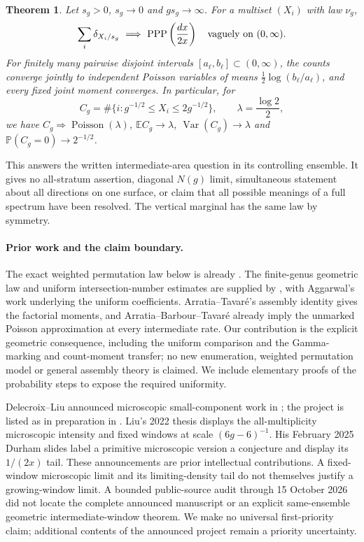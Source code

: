 \documentclass[11pt]{article}
\newtheorem{theorem}{Theorem}
\theoremstyle{remark}\newtheorem{remark}[theorem]{Remark}
\newcommand{\E}{\mathbb E}\newcommand{\Prob}{\mathbb P}
\newcommand{\Poi}{\operatorname{Poisson}}\newcommand{\Gam}{\operatorname{Gamma}}
\begin{document}
\begin{theorem}\label{thm:main}
Let $s_g>0$, $s_g\to0$ and $gs_g\to\infty$. For a multiset $(X_i)$ with law $\nu_g$,
\[
 \sum_i\delta_{X_i/s_g}\ \Longrightarrow\ \PPP\left(\frac{dx}{2x}\right)
 \quad\text{vaguely on }(0,\infty).
\]
For finitely many pairwise disjoint intervals $[a_\ell,b_\ell]\subset(0,\infty)$, the counts converge jointly to independent Poisson variables of means $\tfrac12\log(b_\ell/a_\ell)$, and every fixed joint moment converges. In particular, for
\[
 C_g=\#\{i:g^{-1/2}\le X_i\le2g^{-1/2}\},\qquad \lambda=\frac{\log2}{2},
\]
we have $C_g\Rightarrow\Poi(\lambda)$, $\E C_g\to\lambda$, $\operatorname{Var}(C_g)\to\lambda$ and $\Prob(C_g=0)\to2^{-1/2}$.
\end{theorem}

This answers the written intermediate-area question in its controlling ensemble. It gives no all-stratum assertion, diagonal $N(g)$ limit, simultaneous statement about all directions on one surface, or claim that all possible meanings of a full spectrum have been resolved. The vertical marginal has the same law by symmetry.

\paragraph{Prior work and the claim boundary.}
The exact weighted permutation law below is already \cite[(1.7)--(1.8), Lemma 3.6]{DGZZ}. The finite-genus geometric law and uniform intersection-number estimates are supplied by \cite{DL,DGZZ}, with Aggarwal's work \cite{Agg} underlying the uniform coefficients. Arratia--Tavar\'e's assembly identity \cite[Lemma 5, (126)]{AT} gives the factorial moments, and Arratia--Barbour--Tavar\'e \cite[Theorem 3.1]{ABT} already imply the unmarked Poisson approximation at every intermediate rate. Our contribution is the explicit geometric consequence, including the uniform comparison and the Gamma-marking and count-moment transfer; no new enumeration, weighted permutation model or general assembly theory is claimed. We include elementary proofs of the probability steps to expose the required uniformity.

Delecroix--Liu announced microscopic small-component work in \cite[p.~5098]{DL}; the project is listed as in preparation in \cite[reference 5]{OWR}. Liu's 2022 thesis \cite[Remark 1.5.9]{Liu} displays the all-multiplicity microscopic intensity and fixed windows at scale $(6g-6)^{-1}$. His February 2025 Durham slides \cite[slide 195]{Slides} label a primitive microscopic version a conjecture and display its $1/(2x)$ tail. These announcements are prior intellectual contributions. A fixed-window microscopic limit and its limiting-density tail do not themselves justify a growing-window limit. A bounded public-source audit through 15 October 2026 did not locate the complete announced manuscript or an explicit same-ensemble geometric intermediate-window theorem. We make no universal first-priority claim; additional contents of the announced project remain a priority uncertainty.
\end{document}
